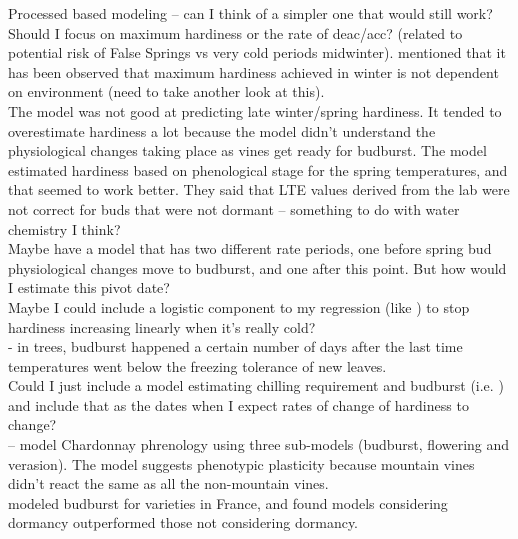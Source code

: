 \documentclass[11pt,letter]{article}
\begin{document}
Processed based modeling – can I think of a simpler one that would still work? \\

Should I focus on maximum hardiness or the rate of deac/acc? (related to potential risk of False Springs vs very cold periods midwinter). \cite{Charrier2013} mentioned that it has been observed that maximum hardiness achieved in winter is not dependent on environment (need to take another look at this).\\

The \cite{Ferguson2011} model was not good at predicting late winter/spring hardiness. It tended to overestimate hardiness a lot because the model didn't understand the physiological changes taking place as vines get ready for budburst. The \cite{Ferguson2014} model estimated hardiness based on phenological stage for the spring temperatures, and that seemed to work better. They said that LTE values derived from the lab were not correct for buds that were not dormant – something to do with water chemistry I think?\\

Maybe have a model that has two different rate periods, one before spring  bud physiological changes move to budburst, and one after this point. But how would I estimate this pivot date? \\

Maybe I could include a logistic component to my regression (like \cite{Ferguson2011}) to stop hardiness increasing linearly when it’s really cold? \\

\cite{Lenz2016} - in trees, budburst happened a certain number of days after the last time temperatures went below the freezing tolerance of new leaves. \\

Could I just include a model estimating chilling requirement and budburst (i.e. \cite{Caffarra2010}) and include that as the dates when I expect rates of change of hardiness to change? \\

\cite{Caffarra2010} – model Chardonnay phrenology using three sub-models (budburst, flowering and verasion). The model suggests phenotypic plasticity because mountain vines didn't react the same as all the non-mountain vines. \\  

\cite{Cortazar-Atauri2009} modeled budburst for varieties in France, and found models considering dormancy outperformed those not considering dormancy. \\  
\end{document}
